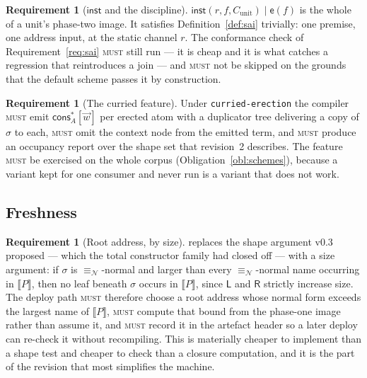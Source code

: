 \documentclass[11pt,a4paper]{article}
\newcommand{\code}[1]{\texttt{#1}}
\newcommand{\MUST}{\textsc{must}}
\newcommand{\enc}[1]{\llbracket #1 \rrbracket}
\newcommand{\nequiv}{\equiv_{\mathcal{N}}}
\newcommand{\ev}{\mathsf{e}}
\newcommand{\cons}{\mathsf{cons}}
\newcommand{\Lft}{\mathsf{L}}
\newcommand{\Rgt}{\mathsf{R}}
\newcommand{\inst}{\mathsf{inst}}
\theoremstyle{definition}
\newtheorem{requirement}[definition]{Requirement}
\theoremstyle{plain}
\begin{document}
\begin{requirement}[$\inst$ and the discipline]\label{req:instsai}
$\inst(r,f,C_{\mathrm{unit}}) \mid \ev(f)$ is the whole of a unit's phase-two
image. It satisfies Definition~\ref{def:sai} trivially: one premise, one
address input, at the static channel $r$. The conformance check of
Requirement~\ref{req:sai} \MUST{} still run --- it is cheap and it is what
catches a regression that reintroduces a join --- and \MUST{} not be skipped
on the grounds that the default scheme passes it by construction.
\end{requirement}

\begin{requirement}[The curried feature]\label{req:curriedfeature}
Under \code{curried-erection} the compiler \MUST{} emit
$\cons^{*}_{A}[\vec w]$ per erected atom with a duplicator tree delivering a
copy of $\sigma$ to each, \MUST{} omit the context node from the emitted term,
and \MUST{} produce an occupancy report over the shape set that
\cite{logic} revision~2 describes. The feature \MUST{} be exercised on the
whole corpus (Obligation~\ref{obl:schemes}), because a variant kept for one
consumer and never run is a variant that does not work.
\end{requirement}

\subsection{Freshness}\label{sec:fresh}

\begin{requirement}[Root address, by size]\label{req:rootaddr}
\cite[Lem.~6.14]{draft3} replaces the shape argument v0.3 proposed --- which
the total constructor family had closed off --- with a size argument: if
$\sigma$ is $\nequiv$-normal and larger than every $\nequiv$-normal name
occurring in $\enc{P}$, then no leaf beneath $\sigma$ occurs in $\enc{P}$,
since $\Lft$ and $\Rgt$ strictly increase size. The deploy path \MUST{}
therefore choose a root address whose normal form exceeds the largest name of
$\enc{P}$, \MUST{} compute that bound from the phase-one image rather than
assume it, and \MUST{} record it in the artefact header so a later deploy can
re-check it without recompiling. This is materially cheaper to implement than
a shape test and cheaper to check than a closure computation, and it is the
part of the revision that most simplifies the machine.
\end{requirement}
\end{document}
